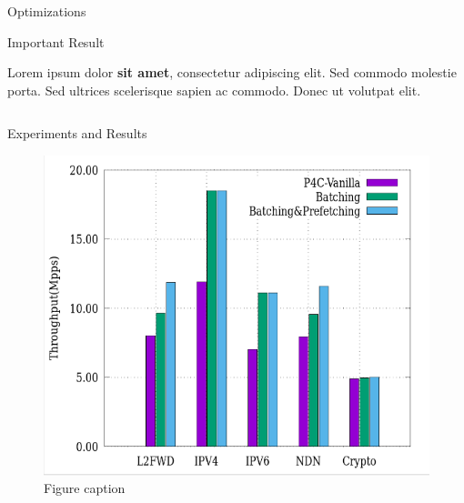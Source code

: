 \documentclass[final]{beamer}
\newlength{\twocolwid}
\begin{document}
\begin{frame}
\begin{columns}[t]
\begin{column}{\twocolwid}
\begin{exampleblock}{Optimizations}
\begin{multicols}{3}
\end{multicols}

\end{exampleblock}



\begin{alertblock}{Important Result}

Lorem ipsum dolor \textbf{sit amet}, consectetur adipiscing elit. Sed commodo molestie porta. Sed ultrices scelerisque sapien ac commodo. Donec ut volutpat elit.

\end{alertblock} 


\begin{columns}[t,totalwidth=\twocolwid] %

\begin{column}{\twocolwid} %


\begin{exampleblock}{ Experiments and Results}

\begin{multicols}{3}

\begin{figure}
\includegraphics[width=1\linewidth]{img/batching_and_prefetching}
\caption{Figure caption}
\end{figure}


\end{multicols}
\end{exampleblock}
\end{column}
\end{columns}
\end{column}
\end{columns}
\end{frame}
\end{document}
